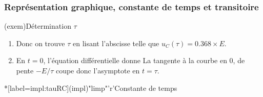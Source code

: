\documentclass[../../main/main.tex]{subfiles}
\begin{document}
\subsubsection{Représentation graphique, constante de temps et transitoire}
\begin{tcbraster}[raster columns=2, raster equal height=rows]
	\begin{tcb}[label=impl:déterm](exem){Détermination $\tau$}
		\begin{enumerate}
			\item {}
			      \smallbreak
			      Donc on trouve $\tau$ en lisant l'abscisse telle que $u_C(\tau) =
				      \num{0.368}\times E$.
			\item En $t=0$, l'équation différentielle donne
			      \psw{
				      \[
					      \dv{u_C}{t}\/ (0) + \overbracket[1pt]{\frac{u_C(0)}{RC}}^{=E} = 0
				      \]
			      }
			      La tangente à la courbe en 0, de pente $-E/\tau$ coupe donc
			      l'asymptote en $t = \tau$.
		\end{enumerate}
	\end{tcb}
	\begin{tcb}*[label=impl:tauRC](impl)"limp"'r'{Constante de temps}
\end{tcb}
\end{tcbraster}
\end{document}
